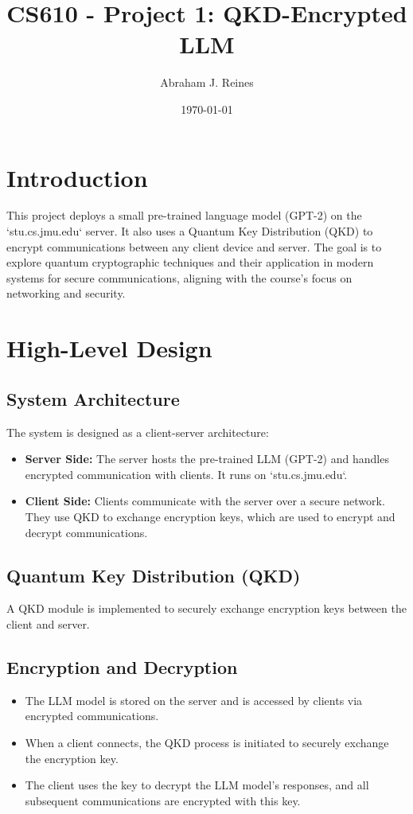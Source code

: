 \documentclass{article}
\title{CS610 - Project 1: QKD-Encrypted LLM}
\author{Abraham J. Reines}
\date{\today}
\begin{document}
\maketitle

\tableofcontents

\section{Introduction}
This project deploys a small pre-trained language model (GPT-2) on the `stu.cs.jmu.edu` server. It also uses a Quantum Key Distribution (QKD) to encrypt communications between any client device and server. The goal is to explore quantum cryptographic techniques and their application in modern systems for secure communications, aligning with the course's focus on networking and security.

\section{High-Level Design}

\subsection{System Architecture}
The system is designed as a client-server architecture:
\begin{itemize}
    \item \textbf{Server Side:} The server hosts the pre-trained LLM (GPT-2) and handles encrypted communication with clients. It runs on `stu.cs.jmu.edu`.
    \item \textbf{Client Side:} Clients communicate with the server over a secure network. They use QKD to exchange encryption keys, which are used to encrypt and decrypt communications.
\end{itemize}

\subsection{Quantum Key Distribution (QKD)}
A QKD module is implemented to securely exchange encryption keys between the client and server.

\subsection{Encryption and Decryption}
\begin{itemize}
    \item The LLM model is stored on the server and is accessed by clients via encrypted communications.
    \item When a client connects, the QKD process is initiated to securely exchange the encryption key.
    \item The client uses the key to decrypt the LLM model's responses, and all subsequent communications are encrypted with this key.
\end{itemize}
\end{document}
